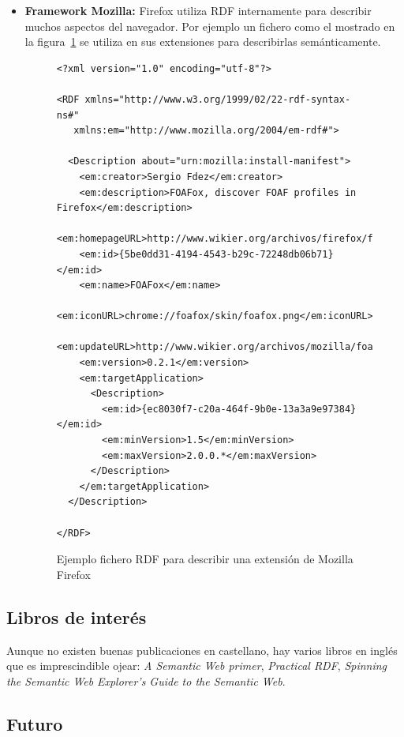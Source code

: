 \begin{itemize}
  \item \textbf{Framework Mozilla:} Firefox utiliza RDF internamente para 
	describir muchos aspectos del navegador. Por ejemplo un fichero como 
	el mostrado en la figura~\ref{fig:rdf.firefox} se utiliza en sus
	extensiones para describirlas semánticamente.

\begin{figure}[H]
\lstset{language=XML}
\begin{lstlisting}
<?xml version="1.0" encoding="utf-8"?>

<RDF xmlns="http://www.w3.org/1999/02/22-rdf-syntax-ns#"
   xmlns:em="http://www.mozilla.org/2004/em-rdf#">

  <Description about="urn:mozilla:install-manifest">
    <em:creator>Sergio Fdez</em:creator>
    <em:description>FOAFox, discover FOAF profiles in Firefox</em:description>
    <em:homepageURL>http://www.wikier.org/archivos/firefox/foafox/</em:homepageURL>
    <em:id>{5be0dd31-4194-4543-b29c-72248db06b71}</em:id>
    <em:name>FOAFox</em:name>
    <em:iconURL>chrome://foafox/skin/foafox.png</em:iconURL>
    <em:updateURL>http://www.wikier.org/archivos/mozilla/foafox/update.rdf</em:updateURL>
    <em:version>0.2.1</em:version>
    <em:targetApplication>
      <Description>
        <em:id>{ec8030f7-c20a-464f-9b0e-13a3a9e97384}</em:id>
        <em:minVersion>1.5</em:minVersion>
        <em:maxVersion>2.0.0.*</em:maxVersion>
      </Description>
    </em:targetApplication>
  </Description>

</RDF>
\end{lstlisting}
\caption{Ejemplo fichero RDF para describir una extensión de Mozilla Firefox}
\label{fig:rdf.firefox}
\end{figure}

\end{itemize}

\subsection{Libros de interés}

Aunque no existen buenas publicaciones en castellano, hay varios libros en inglés 
que es imprescindible ojear: \emph{A Semantic Web primer}\cite{SemanticWebPrimer},
\emph{Practical RDF}\cite{PracticalRDF}, 
\emph{Spinning the Semantic Web}\cite{SpinningSemanticWeb}
\emph{Explorer's Guide to the Semantic Web}\cite{ExplorerSemanticWeb}.

\subsection{Futuro}

